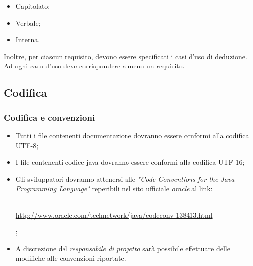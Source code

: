 \begin{itemize}
\item Capitolato;
\item Verbale;
\item Interna.
\end{itemize}
Inoltre, per ciascun requisito, devono essere specificati i casi d'uso di deduzione.\\
Ad ogni caso d'uso deve corrispondere almeno un requisito.

\subsection{Codifica}
\subsubsection{Codifica e convenzioni}
\begin{itemize}

\item Tutti i file contenenti documentazione dovranno essere conformi alla codifica UTF-8;

\item I file contenenti codice java  dovranno essere conformi alla codifica UTF-16;

\item Gli sviluppatori dovranno attenersi alle \textit{"Code Conventions for the Java Programming Language"} reperibili nel sito ufficiale \textit{oracle} al link:\\ \\
\centerline{ \url{http://www.oracle.com/technetwork/java/codeconv-138413.html}};

\item A discrezione del \textit{responsabile di progetto} sarà possibile effettuare delle modifiche alle convenzioni riportate.
\end{itemize}
